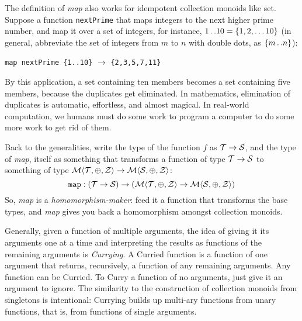 The definition of \emph{map} also works for idempotent collection monoids like set. Suppose a function \verb"nextPrime" that maps integers to the next higher prime number, and map it over a set of integers, for instance, $1{\text{\,.\,.}}10=\{1,2,\ldots10\}$ (in general, abbreviate the set of integers from $m$ to $n$ with double dots, as $\{ m{\text{\,.\,.}}n\}$):
\begin{center}
  \verb"map nextPrime {1..10}" $\rightarrow$ \verb"{2,3,5,7,11}"
\end{center}
By this application, a set containing ten members becomes a set containing five members, because the duplicates get eliminated. In mathematics, elimination of duplicates is automatic, effortless, and almost magical. In real-world computation, we humans must do some work to program a computer to do some more work to get rid of them.


Back to the generalities, write the type of the function $f$ as $\mathcal{T}\rightarrow\mathcal{S}$, and the type of \emph{map}, itself as something that transforms a function of type $\mathcal{T}\rightarrow\mathcal{S}$ to something of type $\mathcal{M}\langle{\mathcal{T}},{\oplus},{\mathcal{Z}}\rangle\rightarrow\mathcal{M}\langle{\mathcal{S}},{\oplus},{\mathcal{Z}}\rangle$:
\begin{equation}
  \mathtt{map}:(\mathcal{T}\rightarrow\mathcal{S})\rightarrow
    \left(\mathcal{M}\langle{\mathcal{T}},{\oplus},{\mathcal{Z}}\rangle
    \rightarrow\mathcal{M}\langle{\mathcal{S}},{\oplus},{\mathcal{Z}}\rangle\right)
  \label{eqn:mapdefinition}
\end{equation}
So, \emph{map} is a \emph{homomorphism-maker}: feed it a function that transforms the base types, and \emph{map} gives you back a homomorphism amongst collection monoids.


\begin{remark}
Generally, given a function of multiple arguments, the idea of giving it its arguments one at a time and interpreting the results as functions of the remaining arguments is \emph{Currying}. A Curried function is a function of one argument that returns, recursively, a function of any remaining arguments. Any function can be Curried. To Curry a function of no arguments, just give it an argument to ignore. The similarity to the construction of collection monoids from singletons is intentional: Currying builds up multi-ary functions from unary functions, that is, from functions of single arguments.
\end{remark}


